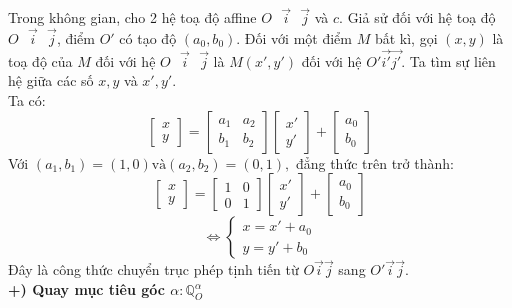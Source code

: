 \documentclass[12pt,a4]{article}
\begin{document}
\begin{titlepage}
\begin{center}
        \end{center}
    Trong không gian, cho 2 hệ toạ độ affine $O\textbf{ } \vec{i}\textbf{ } \vec{j}$ và $c$. Giả sử đối với hệ toạ độ $O\textbf{ }\vec{i}\textbf{ }\vec{j}$, điểm $O'$ có tạo độ $(a_0,b_0)$. Đối với một điểm $M$ bất kì, gọi $(x,y)$ là toạ độ của $M$ đối với hệ $O\textbf{ }\vec{i}\textbf{ }\vec{j}$ là $M(x',y')$ đối với hệ $O'\vec{i'}\vec{j'}$. Ta tìm sự liên hệ giữa các số $x,y$ và $x',y'$.\\
    Ta có: \[\begin{bmatrix}x\\y \end{bmatrix} = \begin{bmatrix}a_1 & a_2 \\ b_1 & b_2 \end{bmatrix} \begin{bmatrix}x'\\y' \end{bmatrix} + \begin{bmatrix}a_0\\b_0\end{bmatrix}\]
    Với $(a_1,b_1) = (1,0) \text{và} (a_2,b_2) = (0,1),$ đẳng thức trên trở thành:
    \[\begin{bmatrix}x\\y \end{bmatrix} = \begin{bmatrix}1 & 0 \\ 0 & 1 \end{bmatrix} \begin{bmatrix}x'\\y' \end{bmatrix} + \begin{bmatrix}a_0\\b_0\end{bmatrix}\]
    \[
    \Leftrightarrow \begin{cases} x = x' + a_0\\y = y' + b_0\end{cases}
    \]
    Đây là công thức chuyển trục phép tịnh tiến từ $O \vec{i} \vec{j}$ sang $O'\vec{i} \vec{j}$.\\
    \textbf{+) Quay mục tiêu góc $\alpha: \mathbb{Q}_O^\alpha$}\\
    \begin{center}
        \begin{tikzpicture}[scale=2]


\end{tikzpicture}
\end{center}
\end{titlepage}
\end{document}
